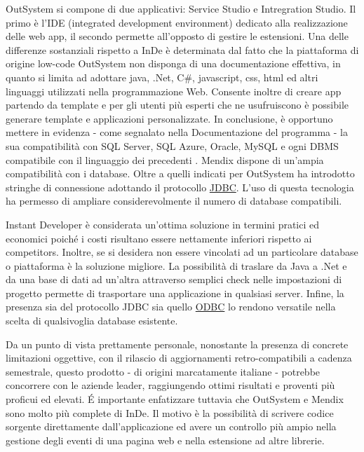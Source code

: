 OutSystem si compone di due applicativi: Service Studio e Intregration Studio. Il primo è l'IDE (integrated development environment) dedicato alla realizzazione delle web app, il secondo permette all'opposto di gestire le estensioni.
Una delle differenze sostanziali rispetto a InDe è determinata dal fatto che la piattaforma di origine low-code OutSystem non disponga di una documentazione effettiva, in quanto si limita ad adottare java, .Net, C\#, javascript, css, html ed altri linguaggi utilizzati nella programmazione Web. 
Consente inoltre di creare app partendo da template e per gli utenti più esperti che ne usufruiscono è possibile generare template e applicazioni personalizzate.
In conclusione, è opportuno mettere in evidenza - come segnalato nella Documentazione del programma - la sua compatibilità con SQL Server, SQL Azure, Oracle, MySQL e ogni DBMS compatibile con il linguaggio dei precedenti \hyperref[bib25]{\cite{[25]}}. 
Mendix dispone di un'ampia compatibilità con i database.  Oltre a quelli indicati per OutSystem ha introdotto stringhe di connessione adottando il protocollo \hyperref[JDBC]{JDBC}. L'uso di questa tecnologia ha permesso di ampliare considerevolmente il numero di database compatibili.

Instant Developer è considerata un'ottima soluzione in termini pratici ed economici poiché i costi risultano essere nettamente inferiori rispetto ai competitors. Inoltre, se si desidera non essere vincolati ad un particolare database o piattaforma è la soluzione migliore. La possibilità di traslare da Java a .Net e da una base di dati ad un'altra attraverso semplici check nelle impostazioni di progetto permette di trasportare una applicazione in qualsiasi server. Infine, la presenza sia del protocollo JDBC sia quello \hyperref[ODBC]{ODBC} lo rendono versatile nella scelta di qualsivoglia database esistente.

Da un punto di vista prettamente personale, nonostante la presenza di concrete limitazioni oggettive, con il rilascio di aggiornamenti retro-compatibili a cadenza semestrale, questo prodotto - di origini marcatamente italiane - potrebbe concorrere con le aziende leader, raggiungendo ottimi risultati e proventi più proficui ed elevati. 
\'E importante enfatizzare tuttavia che OutSystem e Mendix sono molto più complete di InDe. Il motivo è la possibilità di scrivere codice sorgente direttamente dall'applicazione ed avere un controllo più ampio nella gestione degli eventi di una pagina web e nella estensione ad altre librerie.

